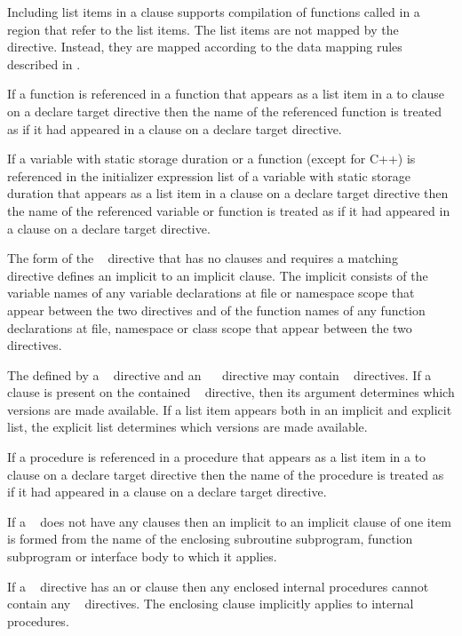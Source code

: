 Including list items in a  clause supports compilation of
functions called in a  region that refer to the list
items.  The list items are not mapped by the ~
directive.  Instead, they are mapped according to the data mapping
rules described in 
.

\begin{ccppspecific}
If a function is referenced in a function that appears as a list item in a to
clause on a declare target directive then the name of the referenced function
is treated as if it had appeared in a  clause on a declare target directive.

If a variable with static storage duration or a function (except 
for C++) is referenced in the initializer expression list of a variable with
static storage duration that appears as a list item in a  clause on a declare
target directive then the name of the referenced variable or function is treated
as if it had appeared in a  clause on a declare target directive.

The form of the ~ directive that has no clauses
and requires a matching ~~ directive
defines an implicit  to an implicit 
clause. The implicit  consists of the variable names
of any variable declarations at file or namespace scope that appear between
the two directives and of the function names of any function declarations at
file, namespace or class scope that appear between the two directives.

The  defined by a
~ directive and an
~~ directive may contain
~ directives. If a  clause
is present on the contained ~ directive, then its
argument determines which versions are made available.
If a list item appears both in an implicit and explicit list, the explicit
list determines which versions are made available.

\end{ccppspecific}

\begin{fortranspecific}
If a procedure is referenced in a procedure that appears as a list item in a to
clause on a declare target directive then the name of the procedure is treated
as if it had appeared in a  clause on a declare target directive.

If a ~ does not have any clauses then an implicit
 to an implicit  clause of one item is formed from
the name of the enclosing subroutine subprogram, function subprogram or
interface body to which it applies.

If a ~ directive has an  or  clause
then any enclosed internal procedures cannot contain any ~ directives.
The enclosing  clause implicitly applies to internal procedures.
\end{fortranspecific}



